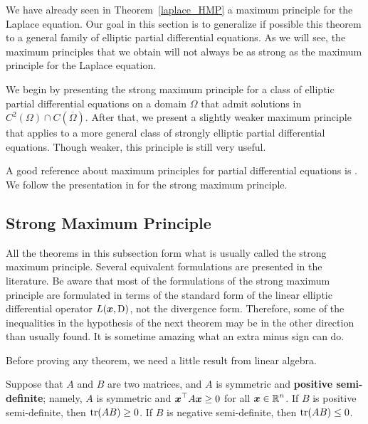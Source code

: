 We have already seen in Theorem~\ref{laplace_HMP} a maximum principle
for the Laplace equation.  Our goal in this section is to generalize
if possible this theorem to a general family of elliptic partial differential
equations.  As we will see, the maximum principles that we obtain will
not always be as strong as the maximum principle for the Laplace
equation.  

We begin by presenting the strong maximum principle for a class of
elliptic partial differential equations on a domain $\Omega$ that
admit solutions in $\displaystyle C^2(\Omega) \cap C(\overline{\Omega})$.
After that, we present a slightly weaker maximum principle that
applies to a more general class of strongly elliptic partial
differential equations.   Though weaker, this principle is still very useful.

A good reference about maximum principles for partial differential
equations is \cite{ProWei}.  We follow the presentation in \cite{Smo}
for the strong maximum principle.

\subsection{Strong Maximum Principle}

All the theorems in this subsection form what is usually called the
strong maximum principle.  Several equivalent formulations are
presented in the literature.  Be aware that most of the formulations
of the strong maximum principle are formulated in terms of the
standard form of the linear elliptic differential operator
$L({\bm{x}},\operatorname{D})$, not the divergence form. Therefore, some of the
inequalities in the hypothesis of the next theorem may be in the other
direction than usually found.   It is sometime amazing what an extra
minus sign can do.

Before proving any theorem, we need a little result from linear
algebra.

\begin{prop}
Suppose that $A$ and $B$ are two \nn matrices, and $A$ is symmetric
and {\bfseries positive semi-definite};
namely, $A$ is symmetric and $\displaystyle {\bm{x}}^\top A{\bm{x}} \geq 0$ for
all $\displaystyle {\bm{x}} \in \mathbb{R}^n$.
If $B$ is positive semi-definite, then $\operatorname{tr}(AB) \geq 0$.
If $B$ is negative semi-definite, then $\operatorname{tr}(AB) \leq 0$.
\end{prop}

